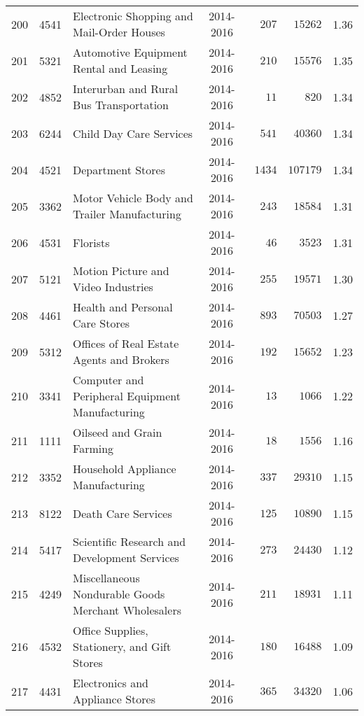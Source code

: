 \documentclass[9pt, oneside]{article}   	%
\begin{document}
\begin{longtable}{lcp{3in}cccc}
200  & 4541 & Electronic Shopping and Mail-Order Houses & 2014-2016 & $\phantom{00}207$ & $\phantom{0}15262$ &  1.36 \\
201  & 5321 & Automotive Equipment Rental and Leasing & 2014-2016 & $\phantom{00}210$ & $\phantom{0}15576$ &  1.35 \\
202  & 4852 & Interurban and Rural Bus Transportation & 2014-2016 & $\phantom{000}11$ & $\phantom{000}820$ &  1.34 \\
203  & 6244 & Child Day Care Services & 2014-2016 & $\phantom{00}541$ & $\phantom{0}40360$ &  1.34 \\
204  & 4521 & Department Stores & 2014-2016 & $\phantom{0}1434$ & $107179$ &  1.34 \\
205  & 3362 & Motor Vehicle Body and Trailer Manufacturing & 2014-2016 & $\phantom{00}243$ & $\phantom{0}18584$ &  1.31 \\
206  & 4531 & Florists & 2014-2016 & $\phantom{000}46$ & $\phantom{00}3523$ &  1.31 \\
207  & 5121 & Motion Picture and Video Industries & 2014-2016 & $\phantom{00}255$ & $\phantom{0}19571$ &  1.30 \\
208  & 4461 & Health and Personal Care Stores & 2014-2016 & $\phantom{00}893$ & $\phantom{0}70503$ &  1.27 \\
209  & 5312 & Offices of Real Estate Agents and Brokers & 2014-2016 & $\phantom{00}192$ & $\phantom{0}15652$ &  1.23 \\
210  & 3341 & Computer and Peripheral Equipment Manufacturing & 2014-2016 & $\phantom{000}13$ & $\phantom{00}1066$ &  1.22 \\
211  & 1111 & Oilseed and Grain Farming & 2014-2016 & $\phantom{000}18$ & $\phantom{00}1556$ &  1.16 \\
212  & 3352 & Household Appliance Manufacturing & 2014-2016 & $\phantom{00}337$ & $\phantom{0}29310$ &  1.15 \\
213  & 8122 & Death Care Services & 2014-2016 & $\phantom{00}125$ & $\phantom{0}10890$ &  1.15 \\
214  & 5417 & Scientific Research and Development Services & 2014-2016 & $\phantom{00}273$ & $\phantom{0}24430$ &  1.12 \\
215  & 4249 & Miscellaneous Nondurable Goods Merchant Wholesalers & 2014-2016 & $\phantom{00}211$ & $\phantom{0}18931$ &  1.11 \\
216  & 4532 & Office Supplies, Stationery, and Gift Stores & 2014-2016 & $\phantom{00}180$ & $\phantom{0}16488$ &  1.09 \\
217  & 4431 & Electronics and Appliance Stores & 2014-2016 & $\phantom{00}365$ & $\phantom{0}34320$ &  1.06 \\

\end{longtable}
\end{document}
